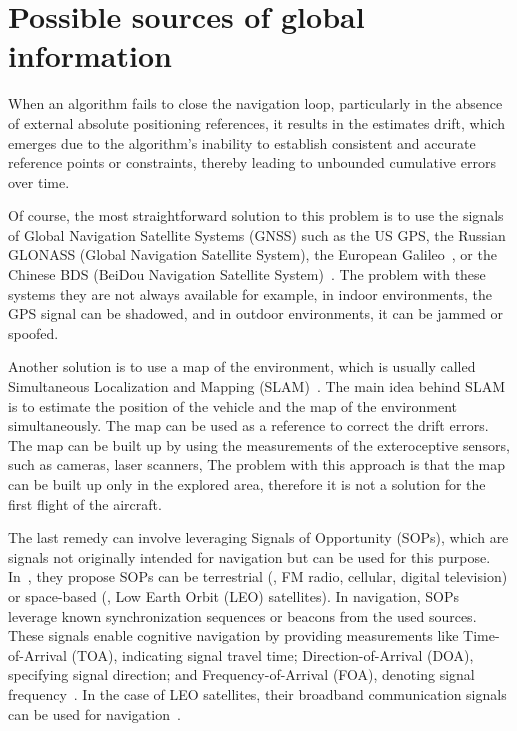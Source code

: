 \section{Possible sources of global information}

When an algorithm fails to close the navigation loop, particularly in the absence of external absolute positioning references, it results in the estimates drift, which emerges due to the algorithm's inability to establish consistent and accurate reference points or constraints, thereby leading to unbounded cumulative errors over time.

Of course, the most straightforward solution to this problem is to use the signals of Global Navigation Satellite Systems (GNSS) such as the US GPS, the Russian GLONASS (Global Navigation Satellite System), the European Galileo~\cite{GNSS}, or the Chinese BDS (BeiDou Navigation Satellite System)~\cite{BeiDou}. The problem with these systems they are not always available for example, in indoor environments, the GPS signal can be shadowed, and in outdoor environments, it can be jammed or spoofed. 

Another solution is to use a map of the environment, which is usually called Simultaneous Localization and Mapping (SLAM)~\cite{SLAM}. The main idea behind SLAM is to estimate the position of the vehicle and the map of the environment simultaneously. The map can be used as a reference to correct the drift errors. The map can be built up by using the measurements of the exteroceptive sensors, such as cameras, laser scanners, \etc{} The problem with this approach is that the map can be built up only in the explored area, therefore it is not a solution for the first flight of the aircraft. 

The last remedy can involve leveraging Signals of Opportunity (SOPs), which are signals not originally intended for navigation but can be used for this purpose. In~\cite{SOP}, they propose SOPs can be terrestrial (\eg{}, FM radio, cellular, digital television) or space-based (\eg{}, Low Earth Orbit (LEO) satellites). In navigation, SOPs leverage known synchronization sequences or beacons from the used sources. These signals enable cognitive navigation by providing measurements like Time-of-Arrival (TOA), indicating signal travel time; Direction-of-Arrival (DOA), specifying signal direction; and Frequency-of-Arrival (FOA), denoting signal frequency~\cite{SOP-terrestrial}. In the case of LEO satellites, their broadband communication signals can be used for navigation~\cite{SOP-LEO}. 

